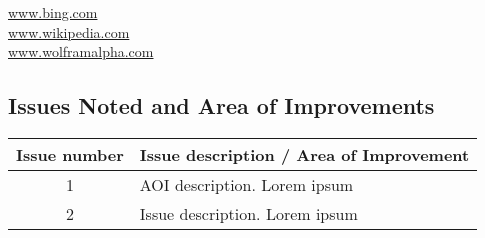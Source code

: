 \url{www.bing.com}\\
\url{www.wikipedia.com}\\
\url{www.wolframalpha.com}\\

\subsection{Issues Noted and Area of Improvements}

\begin{tabular}{c|l}
    Issue number & Issue description / Area of Improvement\\
    \hline
    1 & AOI description. Lorem ipsum\\ \hline
    2 & Issue description. Lorem ipsum\\
    
\end{tabular}